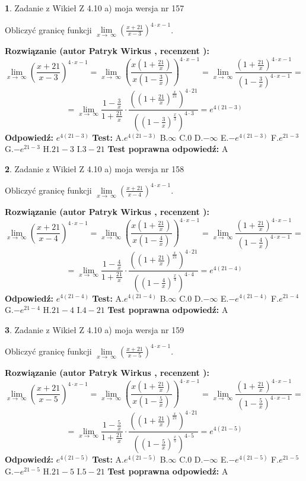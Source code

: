 \documentclass[12pt, a4paper]{article}
\theoremstyle{definition} %
\newtheorem{zad}{}
\newcommand{\zadStart}[1]{\begin{zad}#1\newline}
\newcommand{\zadStop}{\end{zad}}
\newcommand{\rozwStart}[2]{\noindent \textbf{Rozwiązanie (autor #1 , recenzent #2): }\newline}
\newcommand{\rozwStop}{\newline}
\newcommand{\odpStart}{\noindent \textbf{Odpowiedź:}\newline}
\newcommand{\odpStop}{\newline}
\newcommand{\testStart}{\noindent \textbf{Test:}\newline}
\newcommand{\testStop}{\newline}
\newcommand{\kluczStart}{\noindent \textbf{Test poprawna odpowiedź:}\newline}
\newcommand{\kluczStop}{\newline}
\begin{document}
\zadStart{Zadanie z Wikieł Z 4.10 a) moja wersja nr 157}


Obliczyć granicę funkcji  $\lim\limits_{x\to\ \infty}(\frac{x+21}{x-3})^{4\cdot x-1}$.
\zadStop
\rozwStart{Patryk Wirkus}{}
$$\lim\limits_{x\to\ \infty}(\frac{x+21}{x-3})^{4\cdot x-1} = \lim\limits_{x\to\ \infty}(\frac{x(1+\frac{21}{x})}{x(1-\frac{3}{x})})^{4\cdot x-1}=\lim\limits_{x\to\ \infty}\frac{(1+\frac{21}{x})^{4\cdot x-1}}{(1-\frac{3}{x})^{4\cdot x-1}}=$$
$$=\lim\limits_{x\to\ \infty}\frac{1-\frac{3}{x}}{1+\frac{21}{x}}\cdot\frac{((1+\frac{21}{x})^{\frac{x}{21}})^{4\cdot21}}{((1-\frac{3}{x})^{\frac{x}{3}})^{4\cdot3}}=e^{4(21-3)}$$
\rozwStop
\odpStart
$e^{4(21-3)}$
\odpStop
\testStart
A.$e^{4(21-3)}$ B.$\infty$ C.$0$ D.$-\infty$ E.$-e^{4(21-3)}$
F.$e^{21-3}$ G.$-e^{21-3}$
H.$21-3$
I.$3-21$
\testStop
\kluczStart
A
\kluczStop



\zadStart{Zadanie z Wikieł Z 4.10 a) moja wersja nr 158}


Obliczyć granicę funkcji  $\lim\limits_{x\to\ \infty}(\frac{x+21}{x-4})^{4\cdot x-1}$.
\zadStop
\rozwStart{Patryk Wirkus}{}
$$\lim\limits_{x\to\ \infty}(\frac{x+21}{x-4})^{4\cdot x-1} = \lim\limits_{x\to\ \infty}(\frac{x(1+\frac{21}{x})}{x(1-\frac{4}{x})})^{4\cdot x-1}=\lim\limits_{x\to\ \infty}\frac{(1+\frac{21}{x})^{4\cdot x-1}}{(1-\frac{4}{x})^{4\cdot x-1}}=$$
$$=\lim\limits_{x\to\ \infty}\frac{1-\frac{4}{x}}{1+\frac{21}{x}}\cdot\frac{((1+\frac{21}{x})^{\frac{x}{21}})^{4\cdot21}}{((1-\frac{4}{x})^{\frac{x}{4}})^{4\cdot4}}=e^{4(21-4)}$$
\rozwStop
\odpStart
$e^{4(21-4)}$
\odpStop
\testStart
A.$e^{4(21-4)}$ B.$\infty$ C.$0$ D.$-\infty$ E.$-e^{4(21-4)}$
F.$e^{21-4}$ G.$-e^{21-4}$
H.$21-4$
I.$4-21$
\testStop
\kluczStart
A
\kluczStop



\zadStart{Zadanie z Wikieł Z 4.10 a) moja wersja nr 159}


Obliczyć granicę funkcji  $\lim\limits_{x\to\ \infty}(\frac{x+21}{x-5})^{4\cdot x-1}$.
\zadStop
\rozwStart{Patryk Wirkus}{}
$$\lim\limits_{x\to\ \infty}(\frac{x+21}{x-5})^{4\cdot x-1} = \lim\limits_{x\to\ \infty}(\frac{x(1+\frac{21}{x})}{x(1-\frac{5}{x})})^{4\cdot x-1}=\lim\limits_{x\to\ \infty}\frac{(1+\frac{21}{x})^{4\cdot x-1}}{(1-\frac{5}{x})^{4\cdot x-1}}=$$
$$=\lim\limits_{x\to\ \infty}\frac{1-\frac{5}{x}}{1+\frac{21}{x}}\cdot\frac{((1+\frac{21}{x})^{\frac{x}{21}})^{4\cdot21}}{((1-\frac{5}{x})^{\frac{x}{5}})^{4\cdot5}}=e^{4(21-5)}$$
\rozwStop
\odpStart
$e^{4(21-5)}$
\odpStop
\testStart
A.$e^{4(21-5)}$ B.$\infty$ C.$0$ D.$-\infty$ E.$-e^{4(21-5)}$
F.$e^{21-5}$ G.$-e^{21-5}$
H.$21-5$
I.$5-21$
\testStop
\kluczStart
A
\kluczStop
\end{document}
